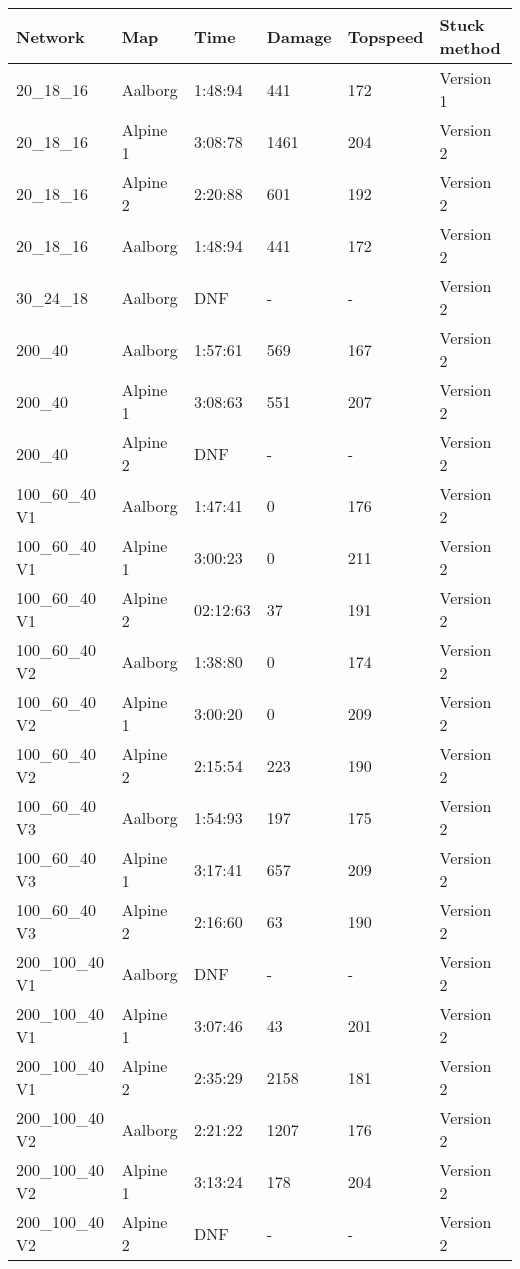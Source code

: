 \documentclass[pt,twoside,a4paper]{article}
\begin{document}
\begin{table}[h]
\noindent
\begin{tabular}{llllll}
 \textbf{Network} & \textbf{Map} & \textbf{Time} & \textbf{Damage} & \textbf{Topspeed}  & \textbf{Stuck method} \\ \hline
 20\_18\_16  & Aalborg & 1:48:94 & 441 & 172 & Version 1 \\
 20\_18\_16 & Alpine 1 & 3:08:78  & 1461 & 204 & Version 2    \\
 20\_18\_16 & Alpine 2 & 2:20:88  & 601 & 192 & Version 2    \\
 20\_18\_16  & Aalborg & 1:48:94 & 441 & 172 & Version 2 \\ \hline
 30\_24\_18  & Aalborg &  DNF & - & - & Version 2 \\ \hline
 200\_40  & Aalborg &  1:57:61 & 569 & 167 & Version 2 \\ 
 200\_40 & Alpine 1 & 3:08:63 & 551 & 207 & Version 2    \\
 200\_40 & Alpine 2 & DNF & - & - & Version 2   \\ \hline 
 100\_60\_40 V1 &  Aalborg & 1:47:41 & 0 & 176 & Version 2 \\
 100\_60\_40 V1 & Alpine 1& 3:00:23 & 0 & 211 & Version 2 \\  
 100\_60\_40 V1 & Alpine 2 & 02:12:63 & 37 & 191 & Version 2   \\ \hline
 100\_60\_40 V2 & Aalborg & 1:38:80  & 0 & 174 & Version 2   \\ 
 100\_60\_40 V2 & Alpine 1 & 3:00:20 & 0 & 209 & Version 2	\\
 100\_60\_40 V2 & Alpine 2 & 2:15:54 & 223 & 190 & Version 2 \\ \hline
 100\_60\_40 V3 & Aalborg & 1:54:93  & 197 & 175 & Version 2   \\ 
 100\_60\_40 V3 & Alpine 1 & 3:17:41  & 657 & 209 & Version 2   \\ 
 100\_60\_40 V3 & Alpine 2 & 2:16:60  & 63 & 190 & Version 2   \\ \hline 
 200\_100\_40 V1 & Aalborg & DNF & - & - & Version 2 \\
 200\_100\_40 V1 & Alpine 1 & 3:07:46 & 43 & 201 & Version 2 \\
 200\_100\_40 V1 & Alpine 2 & 2:35:29 & 2158 & 181 & Version 2 \\ \hline
 200\_100\_40 V2 & Aalborg & 2:21:22 & 1207 & 176 & Version 2 \\
 200\_100\_40 V2 & Alpine 1 & 3:13:24 & 178 & 204 & Version 2 \\
 200\_100\_40 V2 & Alpine 2 & DNF & - & - & Version 2 \\  \hline

\end{tabular}
\end{table}
\end{document}
